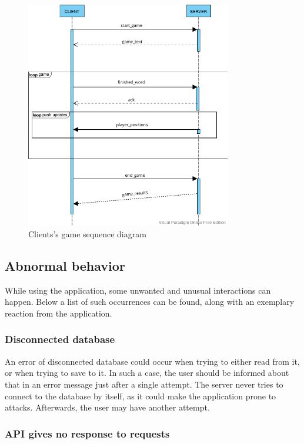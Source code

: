 \documentclass[titlepage]{article}
\begin{document}
\begin{figure}[H]
	\centering
	\includegraphics[width=0.8\textwidth]{seq_diagram_game.png}
	\caption{Clients's game sequence diagram}
	\label{fig:seq-game-leaderboard}
\end{figure}


\subsection{Abnormal behavior}

While using the application, some unwanted and unusual interactions can happen. Below a list of such occurrences can be found, along with an exemplary reaction from the application.

\subsubsection{Disconnected database}

An error of disconnected database could occur when trying to either read from it, or when trying to save to it. In such a case, the user should be informed about that in an error message just after a single attempt. The server never tries to connect to the database by itself, as it could make the application prone to attacks. Afterwards, the user may have another attempt.

\subsubsection{API gives no response to requests}
\end{document}
